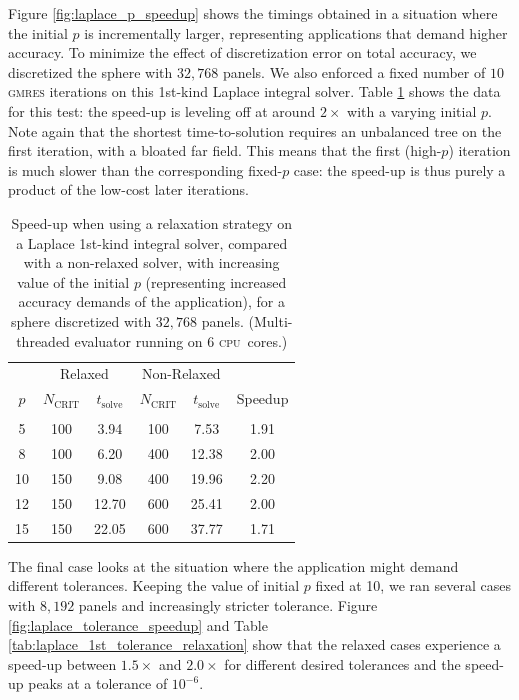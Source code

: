 \documentclass[final,3p,times]{elsarticle}
\newcommand{\cpu}{\textsc{cpu}}
\newcommand{\ncrit}{N_{\text{CRIT}}}
\newcommand{\tsolve}{t_{\text{solve}}}
\newcommand{\gmres}{\textsc{gmres}\xspace}
\begin{document}
Figure \ref{fig:laplace_p_speedup} shows the timings obtained in a situation where the initial $p$ is incrementally larger, representing applications that demand higher accuracy. To minimize the effect of discretization error on total accuracy, we discretized the sphere with $32,768$ panels. We also enforced a fixed number of $10$ \gmres iterations on this 1st-kind Laplace integral solver. Table \ref{tab:laplace_1st_p_relaxation} shows the data for this test: the speed-up is leveling off at around $2\times$ with a varying initial $p$. Note again that the shortest time-to-solution requires an unbalanced tree on the first iteration, with a bloated far field. This means that the first (high-$p$) iteration is much slower than the corresponding fixed-$p$ case: the speed-up is thus purely a product of the low-cost later iterations.

\begin{table}[h]
\footnotesize
\begin{center}
\begin{tabular}{c|cc|cc|c}
  & \multicolumn{2}{c|}{Relaxed} & \multicolumn{2}{c|}{Non-Relaxed} & \\
  $p$ & $\ncrit$ & $\tsolve$ & $\ncrit$ & $\tsolve$ & Speedup \\
   \hline
   & & & & & \\
  5 & 100 & 3.94 & 100 & 7.53 & 1.91 \\
  8 & 100 & 6.20 & 400 & 12.38 & 2.00 \\
  10 & 150 & 9.08 & 400 & 19.96 & 2.20 \\
  12 & 150 & 12.70  & 600 & 25.41 & 2.00 \\
  15 & 150 & 22.05 & 600 & 37.77 & 1.71 \\
 
\end{tabular}
\end{center}
\caption{Speed-up when using a relaxation strategy on a Laplace 1st-kind integral solver, compared with a non-relaxed solver, with increasing value of the initial $p$ (representing increased accuracy demands of the application), for a sphere discretized with $32,768$ panels. (Multi-threaded evaluator running on 6 \cpu\ cores.)}
\label{tab:laplace_1st_p_relaxation}
\end{table}%

The final case looks at the situation where the application might demand different tolerances. Keeping the value of initial $p$ fixed at 10, we ran several cases with $8,192$ panels and increasingly stricter tolerance. Figure \ref{fig:laplace_tolerance_speedup} and Table \ref{tab:laplace_1st_tolerance_relaxation} show that the relaxed cases experience a speed-up between $1.5\times$ and $2.0\times$ for different desired tolerances and the speed-up peaks at a tolerance of $10^{-6}$. 
\end{document}
